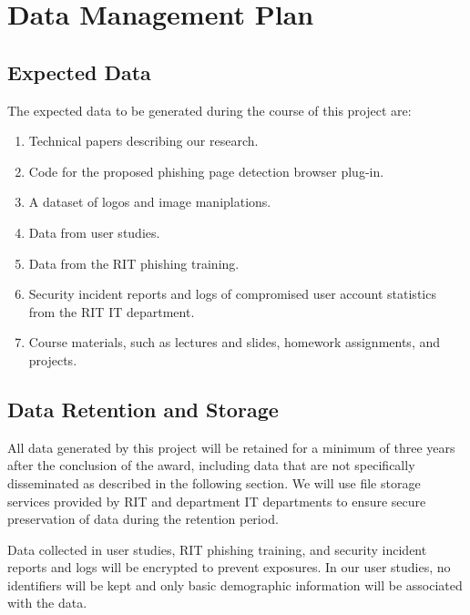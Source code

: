 \documentclass[11pt]{article}
\begin{document}
\renewcommand{\thepage}{DMP-\arabic{page}}
\setcounter{page}{1}

\def\myskip{3ex}

\section*{Data Management Plan}


\subsection*{Expected Data}

The expected data to be generated during the course of this project are:

\begin{enumerate}
  \item Technical papers describing our research.
  \item Code for the proposed phishing page detection browser plug-in.
  \item A dataset of logos and image maniplations.
  \item Data from user studies.
  \item Data from the RIT phishing training.
  \item Security incident reports and logs of compromised user account statistics from the RIT IT department.
  \item Course materials, such as lectures and slides, homework assignments, and projects.
\end{enumerate}

\subsection*{Data Retention and Storage}
All data generated by this project will be retained for a minimum of
three years after the conclusion of the award, including data that are
not specifically disseminated as described in the following section. We
will use file storage services provided by RIT and department IT
departments to ensure secure preservation of data during the retention
period.

Data collected in user studies, RIT phishing training, and security
incident reports and logs will be encrypted to prevent exposures. In our
user studies, no identifiers will be kept and only basic demographic
information will be associated with the data.
\end{document}

